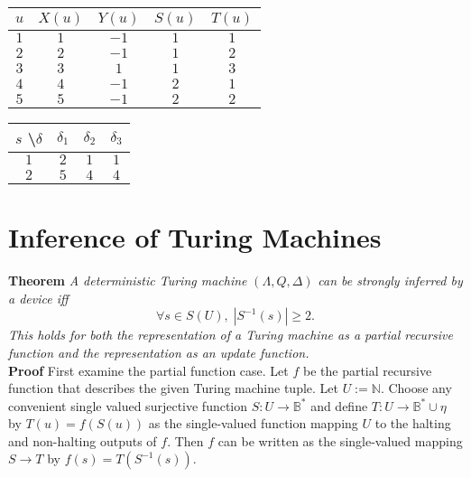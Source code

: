 \documentclass[11pt]{article}
\newcommand{\N}{\mathbb{N}}
\newcommand{\B}{\mathbb{B}}
\begin{document}
 \begin{center}
 \begin{tabular}{ |c||c|c|c|c| } 

 \hline
 $ u $ & $ X(u) $ & $ Y(u) $ & $ S(u) $ & $ T(u) $ \\ 
 \hline
 \hline
 $ 1 $ & $ 1 $ & $ -1 $ & $ 1 $ & $ 1 $ \\
 \hline
 $ 2 $ & $ 2 $ & $ -1 $ & $ 1 $ & $ 2 $ \\
 \hline
 $ 3 $ & $ 3 $ & $ 1 $ & $ 1 $ & $ 3 $ \\
 \hline
 $ 4 $ & $ 4 $ & $ -1 $ & $ 2 $ & $ 1 $ \\
 \hline
 $ 5 $ & $ 5 $ & $ -1 $ & $ 2 $ & $ 2 $ \\
 \hline
 \end{tabular} 
 \quad
 \begin{tabular}{ |c||c|c|c| } 

 \hline
 $ s $ \textbackslash $ \delta $ & $ \delta_1 $ & $ \delta_2 $ & $ \delta_3 $ \\ 
 \hline
 \hline
 $ 1 $ & $ 2 $ & $ 1 $ & $ 1 $  \\
  \hline
 $ 2 $ & $ 5 $ & $ 4 $ & $ 4 $  \\
 \hline
 
 \end{tabular}
 \end{center} 

\bigskip 
\bigskip
\newpage
\section{Inference of Turing Machines}
\textbf{Theorem} \quad \textit{A deterministic Turing machine} $(\Lambda, Q, \Delta)$ \textit{can be strongly inferred by a device iff} 
$$\forall s \in S(U),\; |S^{-1}(s)| \geq 2. $$ \textit{This holds for both the representation of a Turing machine as a partial recursive function and the representation as an update function.} \\

\textbf{Proof} \quad First examine the partial function case. Let $ f $ be the partial recursive function that describes the given Turing machine tuple. Let $ U := \N $. Choose any convenient single valued surjective function $ S: U \rightarrow \B^{*} $ and define $ T: U \rightarrow \B^{*} \cup \eta$ by $T(u) = f(S(u)) $ as the single-valued function mapping $ U $ to the halting and non-halting outputs of $ f $. Then $ f $ can be written as the single-valued mapping $ S \rightarrow T $ by $ f(s) = T(S^{-1}(s)) $. \\
\end{document}
